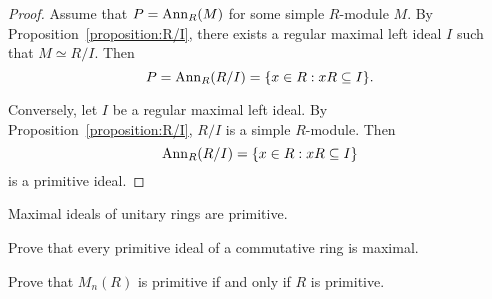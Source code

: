 \begin{proof}
	Assume that $P=\operatorname{Ann}_R(M)$ for some simple $R$-module $M$. By
	Proposition~\ref{proposition:R/I}, there exists a regular maximal 
	left ideal 
	$I$ such that $M\simeq R/I$. Then 
    \[
    P=\operatorname{Ann}_R(R/I)=\{x\in
	R:xR\subseteq I\}.
    \]

	Conversely, let $I$ be a regular maximal left ideal. By
	Proposition~\ref{proposition:R/I}, $R/I$ is a simple $R$-module. Then
	\[
	\operatorname{Ann}_R(R/I)=\{x\in R:xR\subseteq I\}
	\]
	is a primitive ideal.
\end{proof}


\begin{exercise}
\label{xca:maximal=>primitive}
    Maximal ideals of unitary rings are primitive.  
\end{exercise}

\begin{exercise}
\label{xca:primitive=>maximal}
	Prove that every primitive ideal of a commutative ring is maximal.
\end{exercise}

\begin{bonus}
\label{xca:M_n(R)primitive}
    Prove that $M_n(R)$ is primitive if and only if $R$ is primitive.
\end{bonus}

